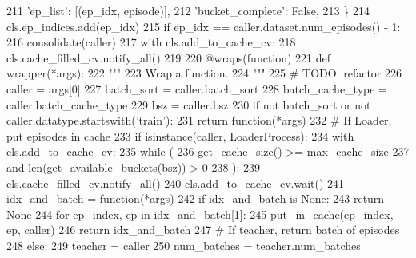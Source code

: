\begin{DoxyCode}
211                         \textcolor{stringliteral}{'ep\_list'}: [(ep\_idx, episode)],
212                         \textcolor{stringliteral}{'bucket\_complete'}: \textcolor{keyword}{False},
213                     \}
214                     cls.ep\_indices.add(ep\_idx)
215             \textcolor{keywordflow}{if} ep\_idx == caller.dataset.num\_episodes() - 1:
216                 consolidate(caller)
217                 with cls.add\_to\_cache\_cv:
218                     cls.cache\_filled\_cv.notify\_all()
219 
220         @wraps(function)
221         \textcolor{keyword}{def }wrapper(*args):
222             \textcolor{stringliteral}{"""}
223 \textcolor{stringliteral}{            Wrap a function.}
224 \textcolor{stringliteral}{            """}
225             \textcolor{comment}{# TODO: refactor}
226             caller = args[0]
227             batch\_sort = caller.batch\_sort
228             batch\_cache\_type = caller.batch\_cache\_type
229             bsz = caller.bsz
230             \textcolor{keywordflow}{if} \textcolor{keywordflow}{not} batch\_sort \textcolor{keywordflow}{or} \textcolor{keywordflow}{not} caller.datatype.startswith(\textcolor{stringliteral}{'train'}):
231                 \textcolor{keywordflow}{return} function(*args)
232             \textcolor{comment}{# If Loader, put episodes in cache}
233             \textcolor{keywordflow}{if} isinstance(caller, LoaderProcess):
234                 with cls.add\_to\_cache\_cv:
235                     \textcolor{keywordflow}{while} (
236                         get\_cache\_size() >= max\_cache\_size
237                         \textcolor{keywordflow}{and} len(get\_available\_buckets(bsz)) > 0
238                     ):
239                         cls.cache\_filled\_cv.notify\_all()
240                         cls.add\_to\_cache\_cv.\hyperlink{namespaceparlai_1_1mturk_1_1scripts_1_1auto__complete__hit_a41016a44ce805b615732efe5c479551c}{wait}()
241                 idx\_and\_batch = function(*args)
242                 \textcolor{keywordflow}{if} idx\_and\_batch \textcolor{keywordflow}{is} \textcolor{keywordtype}{None}:
243                     \textcolor{keywordflow}{return} \textcolor{keywordtype}{None}
244                 \textcolor{keywordflow}{for} ep\_index, ep \textcolor{keywordflow}{in} idx\_and\_batch[1]:
245                     put\_in\_cache(ep\_index, ep, caller)
246                 \textcolor{keywordflow}{return} idx\_and\_batch
247             \textcolor{comment}{# If teacher, return batch of episodes}
248             \textcolor{keywordflow}{else}:
249                 teacher = caller
250                 num\_batches = teacher.num\_batches

\end{DoxyCode}
